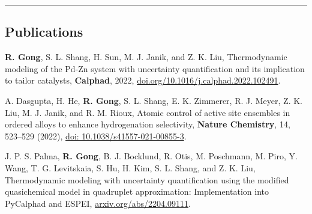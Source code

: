 \documentclass[10pt,letterpaper]{article}
\begin{document}
\hrule
\vspace{-0.6em}
\subsection*{Publications}

\begin{etaremune}
  \item \textbf{R. Gong}, S. L. Shang, H. Sun, M. J. Janik, and Z. K. Liu,
  Thermodynamic modeling of the Pd-Zn system with uncertainty quantification and its implication to tailor catalysts, 
  \textbf{Calphad}, 2022, \href{https://doi.org/10.1016/j.calphad.2022.102491}{doi.org/10.1016/j.calphad.2022.102491}.
  \item  A. Dasgupta, H. He, \textbf{R. Gong}, S. L. Shang, E. K. Zimmerer, R. J. Meyer, Z. K. Liu, M. J. Janik, and R. M. Rioux,
  Atomic control of active site ensembles in ordered alloys to enhance hydrogenation selectivity, 
  \textbf{Nature Chemistry}, 14, 523–529 (2022), \href{https://doi.org/10.1038/s41557-021-00855-3}{doi: 10.1038/s41557-021-00855-3}.
  \item J. P. S. Palma, \textbf{R. Gong}, B. J. Bocklund, R. Otis, M. Poschmann, M. Piro, Y. Wang, T. G. Levitskaia, S. Hu, H. Kim, S. L. Shang, and Z. K. Liu, 
  Thermodynamic modeling with uncertainty quantification using the modified quasichemical model in quadruplet approximation: Implementation into PyCalphad and ESPEI,  \href{http://arxiv.org/abs/2204.09111}{arxiv.org/abs/2204.09111}.
\end{etaremune}
\end{document}
